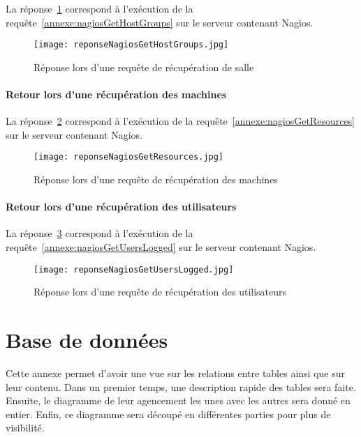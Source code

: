 \begin{appendices}
La r\'eponse~\ref{annexe:reponseNagiosGetHostGroups} correspond \`a l'ex\'ecution de la requ\^ete~\ref{annexe:nagiosGetHostGroups} sur le serveur contenant Nagios.

\begin{figure}[!ht]
	\centering
	\texttt{[image: reponseNagiosGetHostGroups.jpg]}
	\caption{R\'eponse lors d'une requ\^ete de r\'ecup\'eration de salle}
	\label{annexe:reponseNagiosGetHostGroups}

\end{figure}

\subsubsection{Retour lors d'une r\'ecup\'eration des machines}

La r\'eponse~\ref{annexe:reponseNagiosGetResources} correspond \`a l'ex\'ecution de la requ\^ete~\ref{annexe:nagiosGetResources} sur le serveur contenant Nagios.

\begin{figure}[!ht]
	\centering
	\texttt{[image: reponseNagiosGetResources.jpg]}
	\caption{R\'eponse lors d'une requ\^ete de r\'ecup\'eration des machines}
	\label{annexe:reponseNagiosGetResources}

\end{figure}

\subsubsection{Retour lors d'une r\'ecup\'eration des utilisateurs}

La r\'eponse~\ref{annexe:reponseNagiosGetUsersLogged} correspond \`a l'ex\'ecution de la requ\^ete~\ref{annexe:nagiosGetUsersLogged} sur le serveur contenant Nagios.

\begin{figure}[!ht]
	\centering
	\texttt{[image: reponseNagiosGetUsersLogged.jpg]}
	\caption{R\'eponse lors d'une requ\^ete de r\'ecup\'eration des utilisateurs}
	\label{annexe:reponseNagiosGetUsersLogged}

\end{figure}

\chapter{Base de donn\'ees}
\label{chapterAnnexe:baseDeDonnees}

Cette annexe permet d'avoir une vue sur les relations entre tables ainsi que sur leur contenu.
Dans un premier temps, une description rapide des tables sera faite.
Ensuite, le diagramme de leur agencement les unes avec les autres sera donn\'e en entier.
Enfin, ce diagramme sera d\'ecoup\'e en diff\'erentes parties pour plus de visibilit\'e.


\end{appendices}
